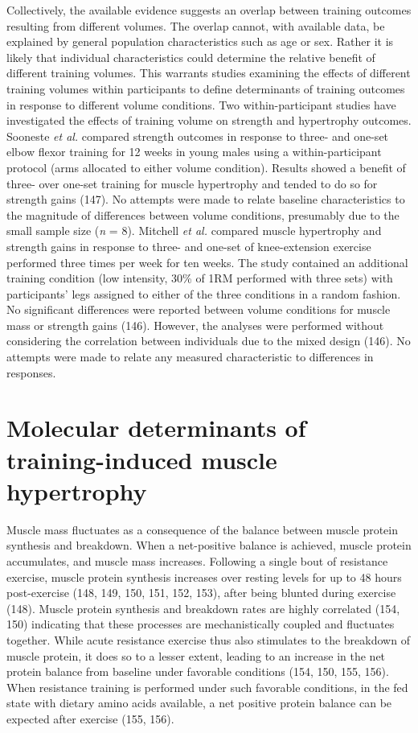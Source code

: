 \documentclass[twoside,10pt]{gihclass} %
\begin{document}
Collectively, the available evidence suggests an overlap between training outcomes resulting from different volumes.
The overlap cannot, with available data, be explained by general population characteristics such as age or sex.
Rather it is likely that individual characteristics could determine the relative benefit of different training volumes.
This warrants studies examining the effects of different training volumes within participants to define determinants of training outcomes in response to different volume conditions.
Two within-participant studies have investigated the effects of training volume on strength and hypertrophy outcomes.
Sooneste \emph{et al.} compared strength outcomes in response to three- and one-set elbow flexor training for 12 weeks in young males using a within-participant protocol (arms allocated to either volume condition).
Results showed a benefit of three- over one-set training for muscle hypertrophy and tended to do so for strength gains (147).
No attempts were made to relate baseline characteristics to the magnitude of differences between volume conditions, presumably due to the small sample size (\emph{n} = 8).
Mitchell \emph{et al.} compared muscle hypertrophy and strength gains in response to three- and one-set of knee-extension exercise performed three times per week for ten weeks.
The study contained an additional training condition (low intensity, 30\% of 1RM performed with three sets) with participants' legs assigned to either of the three conditions in a random fashion.
No significant differences were reported between volume conditions for muscle mass or strength gains (146).
However, the analyses were performed without considering the correlation between individuals due to the mixed design (146).
No attempts were made to relate any measured characteristic to differences in responses.

\hypertarget{molecular-determinants-of-training-induced-muscle-hypertrophy}{%
\section{Molecular determinants of training-induced muscle hypertrophy}\label{molecular-determinants-of-training-induced-muscle-hypertrophy}}

Muscle mass fluctuates as a consequence of the balance between muscle protein synthesis and breakdown. When a net-positive balance is achieved, muscle protein accumulates, and muscle mass increases.
Following a single bout of resistance exercise, muscle protein synthesis increases
over resting levels for up to 48 hours post-exercise
(148, 149, 150, 151, 152, 153),
after being blunted during exercise
(148).
Muscle protein synthesis and breakdown rates are highly correlated
(154, 150)
indicating that these processes are mechanistically coupled and fluctuates together.
While acute resistance exercise thus also stimulates to the breakdown of muscle protein, it does so to a lesser extent, leading to an increase in the net protein balance from baseline under favorable conditions
(154, 150, 155, 156).
When resistance training is performed under such favorable conditions, in the fed state with dietary amino acids available, a net positive protein balance can be expected after exercise
(155, 156).
\end{document}
